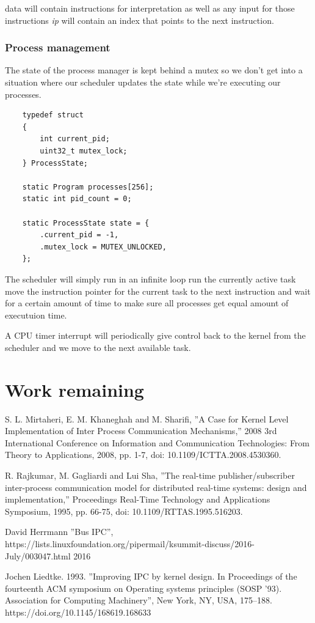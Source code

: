 \documentclass[12pt]{report}
\begin{document}
	data will contain instructions for interpretation as well as any input for those instructions
	\textit{ip} will contain an index that points to the next instruction.
	
	\subsection{Process management}
	The state of the process manager is kept behind a mutex so we don't get into a situation
	where our scheduler updates the state while we're executing our processes.
	
	\begin{verbatim}
	typedef struct
	{
		int current_pid;
		uint32_t mutex_lock;
	} ProcessState;

	static Program processes[256];
	static int pid_count = 0;

	static ProcessState state = {
   	    .current_pid = -1,
   	    .mutex_lock = MUTEX_UNLOCKED,
	};
	\end{verbatim}
	
	The scheduler will simply run in an infinite loop run the currently active task
	move the instruction pointer for the current task to the next instruction and wait for
	a certain amount of time to make sure all processes get equal amount of executuion time.
	
	A CPU timer interrupt will periodically give control back to the kernel from the
	scheduler and we move to the next available task.
	
	\chapter{Work remaining}
	
	\pagebreak
	\begin{thebibliography}{9}
		S. L. Mirtaheri, E. M. Khaneghah and M. Sharifi, 
		''A Case for Kernel Level Implementation of Inter Process Communication Mechanisms,'' 
		2008 3rd International Conference on Information and Communication Technologies: From Theory to Applications, 
		2008, pp. 1-7, doi: 10.1109/ICTTA.2008.4530360.
	
		R. Rajkumar, M. Gagliardi and Lui Sha, 
		''The real-time publisher/subscriber inter-process communication model for distributed real-time systems: design and implementation,'' 
		Proceedings Real-Time Technology and Applications Symposium, 
		1995, pp. 66-75, doi: 10.1109/RTTAS.1995.516203. 

		David Herrmann
		''Bus IPC'', https://lists.linuxfoundation.org/pipermail/ksummit-discuss/2016-July/003047.html
		2016
		
		Jochen Liedtke. 1993. 
		''Improving IPC by kernel design. In Proceedings of the fourteenth ACM symposium on Operating systems principles (SOSP '93). 
		Association for Computing Machinery'', 
		New York, NY, USA, 175–188. 
		https://doi.org/10.1145/168619.168633

	\end{thebibliography}
\end{document}
